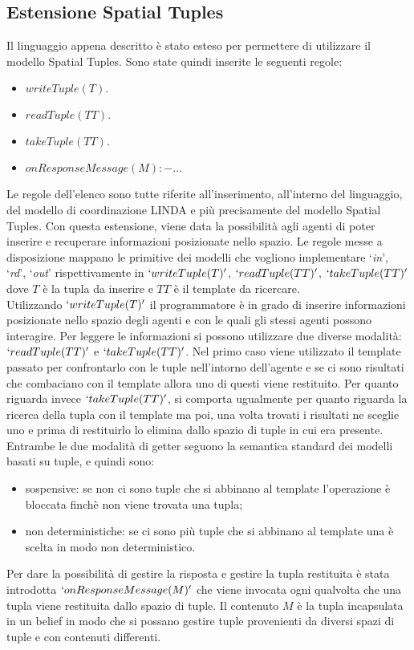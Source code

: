 \subsection{Estensione Spatial Tuples}
Il linguaggio appena descritto è stato esteso per permettere di utilizzare il modello Spatial Tuples. Sono state quindi inserite le seguenti regole:
\begin{itemize}
\item $writeTuple(T).$
\item $readTuple(TT).$
\item $takeTuple(TT).$
\item $onResponseMessage(M) :- \ldots$
\end{itemize}
Le regole dell'elenco sono tutte riferite all'inserimento, all'interno del linguaggio, del modello di coordinazione LINDA e più precisamente del modello Spatial Tuples.
Con questa estensione, viene data la possibilità agli agenti di poter inserire e recuperare informazioni posizionate nello spazio. Le regole messe a disposizione mappano le primitive dei modelli che vogliono implementare `\textit{in}', `\textit{rd}', `\textit{out}' rispettivamente in $`writeTuple(T)'$, $`readTuple(TT)'$, $`takeTuple(TT)'$ dove $T$ è la tupla da inserire e $TT$ è il template da ricercare.
\\
Utilizzando $`writeTuple(T)'$ il programmatore è in grado di inserire informazioni posizionate nello spazio degli agenti e con le quali gli stessi agenti possono interagire. Per leggere le informazioni si possono utilizzare due diverse modalità: $`readTuple(TT)'$ e $`takeTuple(TT)'$. Nel primo caso viene utilizzato il template passato per confrontarlo con le tuple nell'intorno dell'agente e se ci sono risultati che combaciano con il template allora uno di questi viene restituito. Per quanto riguarda invece $`takeTuple(TT)'$, si comporta ugualmente per quanto riguarda la ricerca della tupla con il template ma poi, una volta trovati i risultati ne sceglie uno e prima di restituirlo lo elimina dallo spazio di tuple in cui era presente.
\\
Entrambe le due modalità di getter seguono la semantica standard dei modelli basati su tuple, e quindi sono:
\begin{itemize}
\item sospensive: se non ci sono tuple che si abbinano al template l'operazione è bloccata finchè non viene trovata una tupla;
\item non deterministiche: se ci sono più tuple che si abbinano al template una è scelta in modo non deterministico.
\end{itemize}
Per dare la possibilità di gestire la risposta e gestire la tupla restituita è stata introdotta $`onResponseMessage(M)'$ che viene invocata ogni qualvolta che una tupla viene restituita dallo spazio di tuple. Il contenuto $M$ è la tupla incapsulata in un belief in modo che si possano gestire tuple provenienti da diversi spazi di tuple e con contenuti differenti.

